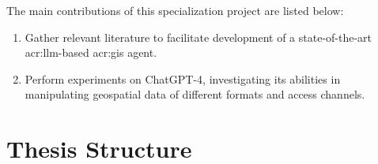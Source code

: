 The main contributions of this specialization project are listed below:
\begin{enumerate}
    \item Gather relevant literature to facilitate development of a state-of-the-art \acrshort{acr:llm}-based \acrshort{acr:gis} agent.
    \item Perform experiments on ChatGPT-4, investigating its abilities in manipulating geospatial data of different formats and access channels.
\end{enumerate}

\section{Thesis Structure}
\label{sec:thesisStructure}


